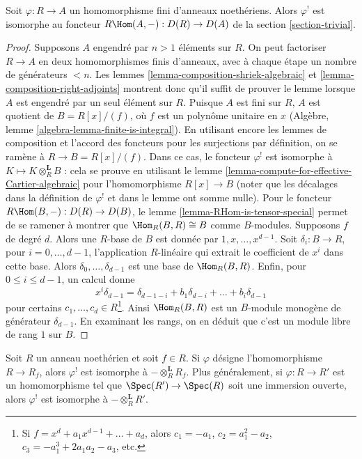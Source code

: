 \begin{lemma}
\label{lemma-upper-shriek-finite}
Soit $\varphi : R \to A$ un homomorphisme fini d'anneaux noethériens.
Alors $\varphi^!$ est isomorphe au foncteur $R\Hom(A, -) : D(R) \to D(A)$ de la section \ref{section-trivial}.
\end{lemma}

\begin{proof}
Supposons $A$ engendré par $n > 1$ éléments sur $R$.
On peut factoriser $R \to A$ en deux homomorphismes finis d'anneaux,
avec à chaque étape un nombre de générateurs $< n$.
Les lemmes \ref{lemma-composition-shriek-algebraic} et \ref{lemma-composition-right-adjoints} montrent donc qu'il suffit de prouver
le lemme lorsque $A$ est engendré par un seul élément sur $R$.
Puisque $A$ est fini sur $R$, $A$ est quotient de $B = R[x]/(f)$,
où $f$ est un polynôme unitaire en $x$ (Algèbre, lemme \ref{algebra-lemma-finite-is-integral}).
En utilisant encore les lemmes de composition et l'accord des foncteurs
pour les surjections par définition, on se ramène à $R \to B = R[x]/(f)$.
Dans ce cas, le foncteur $\varphi^!$ est isomorphe à $K \mapsto K \otimes_R^\mathbf{L} B$ :
cela se prouve en utilisant le lemme \ref{lemma-compute-for-effective-Cartier-algebraic} pour l'homomorphisme $R[x] \to B$
(noter que les décalages dans la définition de $\varphi^!$ et dans le lemme ont somme nulle).
Pour le foncteur $R\Hom(B, -) : D(R) \to D(B)$, le lemme \ref{lemma-RHom-is-tensor-special} permet de se ramener
à montrer que $\Hom_R(B, R) \cong B$ comme $B$-modules.
Supposons $f$ de degré $d$.
Alors une $R$-base de $B$ est donnée par $1, x, \ldots, x^{d - 1}$.
Soit $\delta_i : B \to R$, pour $i = 0, \ldots, d - 1$, l'application $R$-linéaire
qui extrait le coefficient de $x^i$ dans cette base.
Alors $\delta_0, \ldots, \delta_{d - 1}$ est une base de $\Hom_R(B, R)$.
Enfin, pour $0 \leq i \leq d - 1$, un calcul donne
$$
x^i \delta_{d - 1} =
\delta_{d - 1 - i} + b_1 \delta_{d - i} + \ldots + b_i \delta_{d - 1}
$$
pour certains $c_1, \ldots, c_d \in R$\footnote{Si $f = x^d + a_1 x^{d - 1} + \ldots + a_d$, alors
$c_1 = -a_1$, $c_2 = a_1^2 - a_2$, $c_3 = -a_1^3 + 2a_1a_2 -a_3$, etc.}.
Ainsi $\Hom_R(B, R)$ est un $B$-module monogène de générateur $\delta_{d - 1}$.
En examinant les rangs, on en déduit que c'est un module libre
de rang $1$ sur $B$.
\end{proof}

\begin{lemma}
\label{lemma-upper-shriek-localize}
Soit $R$ un anneau noethérien et soit $f \in R$.
Si $\varphi$ désigne l'homomorphisme $R \to R_f$, alors $\varphi^!$ est isomorphe à $- \otimes_R^\mathbf{L} R_f$.
Plus généralement, si $\varphi : R \to R'$ est un homomorphisme tel que
$\Spec(R') \to \Spec(R)$ soit une immersion ouverte, alors $\varphi^!$ est isomorphe à $- \otimes_R^\mathbf{L} R'$.
\end{lemma}

